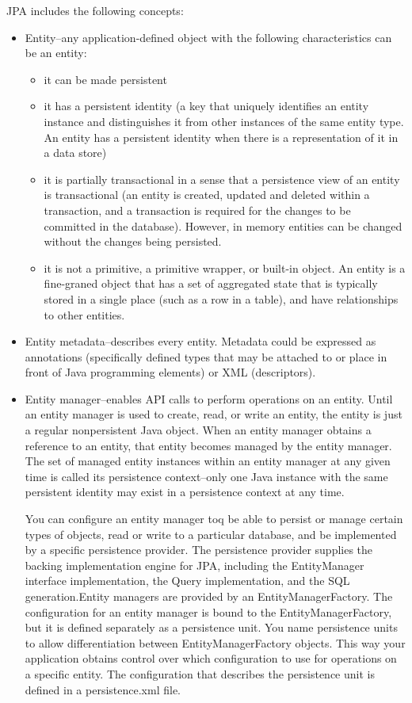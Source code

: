 JPA includes the following concepts:

\begin{itemize}
\item Entity–any application-defined object with the following characteristics can be an entity:

\begin{itemize}
\item it can be made persistent

\item it has a persistent identity (a key that uniquely identifies an entity
instance and distinguishes it from other instances of the same entity type. An
entity has a persistent identity when there is a representation of it in a data
store)

\item it is partially transactional in a sense that a persistence view of an
entity is transactional (an entity is created, updated and deleted within a
transaction, and a transaction is required for the changes to be committed in the
database). However, in memory entities can be changed without the changes being
persisted. 
\item it is not a primitive, a primitive wrapper, or built-in object.
An entity is a fine-graned object that has a set of aggregated state that is
typically stored in a single place (such as a row in a table), and have
relationships to other entities.
\end{itemize}

\item Entity metadata–describes every entity. Metadata could be expressed as
annotations (specifically defined types that may be attached to or place in front
of Java programming elements) or XML (descriptors). 
\item Entity manager–enables
API calls to perform operations on an entity. Until an entity manager is used to
create, read, or write an entity, the entity is just a regular nonpersistent Java
object. When an entity manager obtains a reference to an entity, that entity
becomes managed by the entity manager. The set of managed entity instances within
an entity manager at any given time is called its persistence context–only one
Java instance with the same persistent identity may exist in a persistence
context at any time.

You can configure an entity manager toq be able to persist or manage certain
types of objects, read or write to a particular database, and be implemented by a
specific persistence provider. The persistence provider supplies the backing
implementation engine for JPA, including the EntityManager interface
implementation, the Query implementation, and the SQL generation.Entity managers
are provided by an EntityManagerFactory. The configuration for an entity manager
is bound to the EntityManagerFactory, but it is defined separately as a
persistence unit. You name persistence units to allow differentiation between
EntityManagerFactory objects. This way your application obtains control over
which configuration to use for operations on a specific entity. The configuration
that describes the persistence unit is defined in a persistence.xml file.


\end{itemize}
